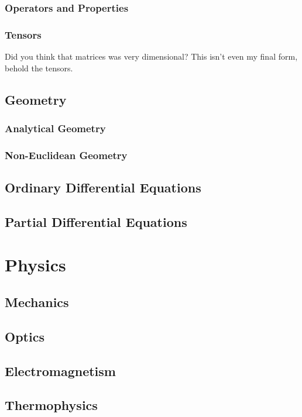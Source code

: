 \subsection{Operators and Properties}

\subsection{Tensors}
Did you think that matrices was very dimensional?
This isn't even my final form, behold the tensors.


\section{Geometry}
\subsection{Analytical Geometry}
\subsection{Non-Euclidean Geometry}

\section{Ordinary Differential Equations}
\section{Partial Differential Equations}

\chapter{Physics}

\section{Mechanics}
\section{Optics}
\section{Electromagnetism}
\section{Thermophysics}


